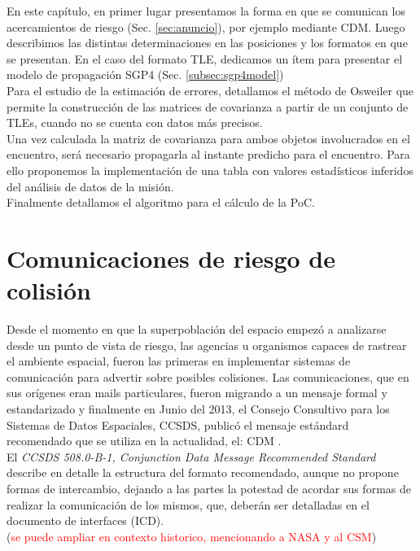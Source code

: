 En este cap\'itulo, en primer lugar presentamos la forma en que se comunican los acercamientos de riesgo (Sec. \ref{sec:anuncio}), por ejemplo mediante \ac{CDM}. Luego describimos las distintas determinaciones en las posiciones y los formatos en que se presentan. En el caso del formato TLE, dedicamos un \'item para presentar el modelo de propagaci\'on SGP4 (Sec. \ref{subsec:sgp4model})\\
Para el estudio de la estimaci\'on de errores, detallamos el m\'etodo de Osweiler \citep{Osweiler} que permite la construcci\'on de las matrices de covarianza a partir de un conjunto de TLEs, cuando no se cuenta con datos m\'as precisos.\\
Una vez calculada la matriz de covarianza para ambos objetos involucrados en el encuentro, ser\'a necesario propagarla al instante predicho para el encuentro. Para ello proponemos la implementaci\'on de una tabla con valores estad\'isticos inferidos del an\'alisis de datos de la misi\'on.\\
Finalmente detallamos el algoritmo para el c\'alculo de la PoC.\\

\section{Comunicaciones de riesgo de colisi\'on}{\label{sec:anuncio}}


Desde el momento en que la superpoblaci\'on del espacio empez\'o a analizarse desde un punto de vista de riesgo, las agencias u organismos capaces de rastrear el ambiente espacial, fueron las primeras en implementar sistemas de comunicaci\'on para advertir sobre posibles colisiones. Las comunicaciones, que en sus or\'igenes eran mails particulares, fueron migrando a un mensaje formal y estandarizado y finalmente en Junio del 2013, el Consejo Consultivo para los Sistemas de Datos Espaciales, \ac{CCSDS}, public\'o el mensaje est\'andard recomendado que se utiliza en la actualidad, el: \ac{CDM} \citep{CDMstd}.\\
El {\it{CCSDS 508.0-B-1, Conjunction Data Message Recommended Standard}} describe en detalle la estructura del formato recomendado, aunque no propone formas de intercambio, dejando a las partes la potestad de acordar sus formas de realizar la comunicaci\'on de los mismos, que, deber\'an ser detalladas en el documento de interfaces (ICD).\\

(\textcolor{red}{se puede ampliar en contexto historico, mencionando a NASA y al CSM})\\

